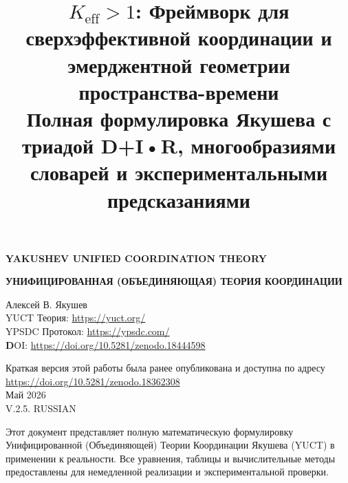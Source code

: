 \documentclass[11pt,a4paper]{article}
\title{$K_{\mathrm{eff}} > 1$: Фреймворк для сверхэффективной координации и эмерджентной геометрии пространства-времени \\ 
	\large Полная формулировка Якушева с триадой D+I•R, многообразиями словарей и экспериментальными предсказаниями}
\begin{document}
	\begin{titlepage}
		\begin{center}
			\vspace*{2cm}
			\Huge\textbf{YAKUSHEV UNIFIED COORDINATION THEORY\\
			}
			
			\vspace*{2cm}
			\Huge\textbf{УНИФИЦИРОВАННАЯ (ОБЪЕДИНЯЮЩАЯ) ТЕОРИЯ КООРДИНАЦИИ
			}
			
			
			
			\vspace{2cm}
			\Large
			Алексей В. Якушев\\
			\vspace{2cm}
			YUCT Теория: \url{https://yuct.org/}\\
			YPSDC Протокол: \url{https://ypsdc.com/}\\
			
			
			\vspace{2cm}
			\textbf DOI: \url{https://doi.org/10.5281/zenodo.18444598}\\
			
			\vspace{1cm}
			
			\vspace{0cm}
			\large 
			Краткая версия этой работы была ранее опубликована и доступна по адресу\\ \url{https://doi.org/10.5281/zenodo.18362308}\\
			\vspace{1cm}
			Май 2026 \\ \large V.2.5. RUSSIAN
			
			\vfill
			\normalsize
			Этот документ представляет полную математическую формулировку Унифицированной (Объединяющей) Теории Координации Якушева (YUCT) в применении к реальности. Все уравнения, таблицы и вычислительные методы предоставлены для немедленной реализации и экспериментальной проверки.
		\end{center}
	\end{titlepage}
	
	
	
	\maketitle
	
\end{document}
